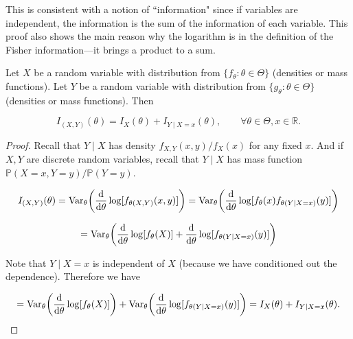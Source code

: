 \begin{remark}This is consistent with a notion of ``information" since if variables are independent, the information is the sum of the information of each variable. This proof also shows the main reason why the logarithm is in the definition of the Fisher information---it brings a product to a sum.

\end{remark}

\begin{proposition}Let \(X\) be a random variable with distribution from \(\{f_\theta:\theta \in \Theta\}\) (densities or mass functions). Let \(Y\) be a random variable with distribution from \(\{g_\theta:\theta \in \Theta\}\) (densities or mass functions). Then

\[
I_{(X,Y)}(\theta) = I_X(\theta) + I_{Y\mid X =x}(\theta), \qquad \forall \theta \in \Theta, x \in \mathbb{R}.
\]

\end{proposition}

\begin{proof}Recall that \(Y \mid X\) has density \(f_{X,Y}(x,y)/f_X(x)\) for any fixed \(x\). And if \(X, Y\) are discrete random variables, recall that \(Y\mid X\) has mass function \(\mathbb{P}(X=x, Y=y) /\mathbb{P}(Y=y)\).

\[
I_{(X,Y)}(\theta) = \Var_\theta \bigg( \deriv{}{\theta} \log [f_{\theta(X, Y)} (x,y)] \bigg)   = \Var_\theta \bigg( \deriv{}{\theta} \log [f_{\theta} (x) f_{\theta(Y \mid X=x)} (y)] \bigg)  
\]


\[
 = \Var_\theta \bigg( \deriv{}{\theta} \log [f_\theta(X) ] +  \deriv{}{\theta}  \log[  f_{\theta(Y \mid X=x)} (y)] \bigg)  
\]

Note that \(Y \mid X =x\) is independent of \(X\) (because we have conditioned out the dependence). Therefore we have

\[
 = \Var_\theta \bigg( \deriv{}{\theta} \log [f_\theta(X) ] \bigg) +  \Var_\theta \bigg( \deriv{}{\theta}  \log[ f_{\theta(Y \mid X=x)} (y)] \bigg)  = I_X(\theta) + I_{Y \mid X = x}(\theta).
 \]


% 
% 

\end{proof}

